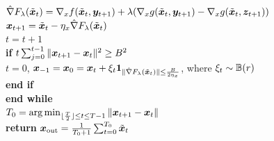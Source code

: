\documentclass{article}
\begin{document}
\begin{algorithm*}[t]
\begin{algorithmic}[1]
\STATE \quad $ \hat \nabla F_\lambda(\tilde {{\bm{x}}}_{t})= \nabla_x f(\tilde {{\bm{x}}}_{t},{\bm{y}}_{t+1}) + \lambda ( \nabla_x g(\tilde {{\bm{x}}}_{t},{\bm{y}}_{t+1}) - \nabla_x g(\tilde {{\bm{x}}}_{t},{\bm{z}}_{t+1}) )$ \\[1mm]
\STATE\quad  ${\bm{x}}_{t+1} = \tilde {{\bm{x}}}_{t} - \eta_x \hat \nabla F_\lambda(\tilde {{\bm{x}}}_{t}) $ \\[1mm]
\STATE \quad $ t = t+1 $ \\ [1mm]
\STATE \quad \textbf{if} $ t \sum_{j=0}^{t-1} \Vert {\bm{x}}_{t+1} - {\bm{x}}_t \Vert^2 \ge B^2$ \\[1mm]
\STATE \quad \quad $t=0$, ${\bm{x}}_{-1} = {\bm{x}}_0 = {\bm{x}}_t + \xi_t {\bm{1}}_{ \Vert \hat \nabla F_\lambda(\tilde {{\bm{x}}}_{t}) \Vert \le \frac{B}{2 \eta_x} }$, {\rm where} $\xi_t \sim {\mathbb{B}}(r)$  \\[1mm] 
\STATE \quad \textbf{end if} \\[1mm]
\STATE \textbf{end while} \\[1mm]
\STATE $T_0 = \arg \min_{\lfloor \frac{T}{2} \rfloor \le t \le T-1} \Vert {\bm{x}}_{t+1} - {\bm{x}}_t \Vert$ \\[1mm]
\STATE \textbf{return} ${\bm{x}}_{\rm out} = \frac{1}{T_0+1} \sum_{t=0}^{T_0} \tilde {{\bm{x}}}_{t}$ \\[1mm]
\end{algorithmic}
\end{algorithm*}
\end{document}
